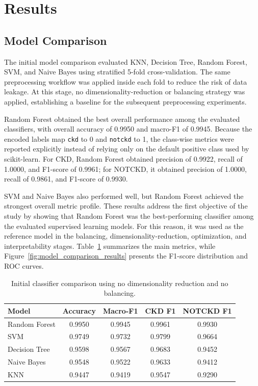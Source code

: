 \section{Results}

\subsection{Model Comparison}

The initial model comparison evaluated KNN, Decision Tree, Random Forest, SVM,
and Naive Bayes using stratified 5-fold cross-validation. The same
preprocessing workflow was applied inside each fold to reduce the risk of data
leakage. At this stage, no dimensionality-reduction or balancing strategy was
applied, establishing a baseline for the subsequent preprocessing experiments.

Random Forest obtained the best overall performance among the evaluated
classifiers, with overall accuracy of 0.9950 and macro-F1 of 0.9945. Because
the encoded labels map \texttt{ckd} to 0 and \texttt{notckd} to 1, the
class-wise metrics were reported explicitly instead of relying only on the
default positive class used by scikit-learn. For CKD, Random Forest obtained
precision of 0.9922, recall of 1.0000, and F1-score of 0.9961; for NOTCKD, it
obtained precision of 1.0000, recall of 0.9861, and F1-score of 0.9930.

SVM and Naive Bayes also performed well, but Random Forest achieved the
strongest overall metric profile. These results address the first objective of
the study by showing that Random Forest was the best-performing classifier
among the evaluated supervised learning models. For this reason, it was used as
the reference model in the balancing, dimensionality-reduction, optimization,
and interpretability stages. Table~\ref{tab:model_comparison} summarizes the
main metrics, while Figure~\ref{fig:model_comparison_results} presents the
F1-score distribution and ROC curves.

\begin{table}[!htbp]
\centering
\caption{Initial classifier comparison using no dimensionality reduction and no balancing.}
\label{tab:model_comparison}
\begin{tabular}{lcccc}
\hline
Model & Accuracy & Macro-F1 & CKD F1 & NOTCKD F1 \\
\hline
Random Forest & 0.9950 & 0.9945 & 0.9961 & 0.9930 \\
SVM & 0.9749 & 0.9732 & 0.9799 & 0.9664 \\
Decision Tree & 0.9598 & 0.9567 & 0.9683 & 0.9452 \\
Naive Bayes & 0.9548 & 0.9522 & 0.9633 & 0.9412 \\
KNN & 0.9447 & 0.9419 & 0.9547 & 0.9290 \\
\hline
\end{tabular}
\end{table}

